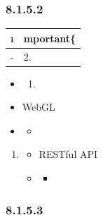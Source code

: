 \hypertarget{section-56}{%
\subsubsection{8.1.5.2}\label{section-56}}

\begin{longtable}[]{@{}ll@{}}
\toprule\noalign{}
\i & mportant\{} \\
\midrule\noalign{}
\endhead
\bottomrule\noalign{}
\endlastfoot
- & 2. \important{} \\
\end{longtable}

\begin{itemize}
\item
  \begin{enumerate}
  \def\labelenumi{\arabic{enumi}.}
    \item
    \important{}
  \end{enumerate}
\item
  WebGL
\item
  \begin{itemize}
  \tightlist
  \item
  \end{itemize}
\end{itemize}

\begin{enumerate}
\def\labelenumi{\arabic{enumi}.}
\item
  \important{}

  \begin{itemize}
  \item
    RESTful API
  \item
    \begin{itemize}
    \tightlist
    \item
    \end{itemize}
  \end{itemize}
\end{enumerate}

\hypertarget{section-57}{%
\subsubsection{8.1.5.3}\label{section-57}}

